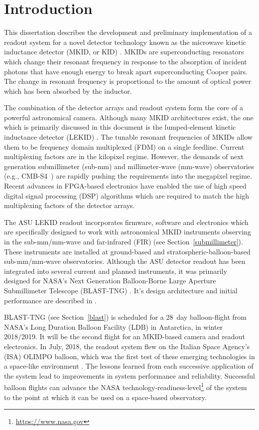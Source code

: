 \chapter{Introduction}\label{intro}

This dissertation describes the development and preliminary implementation of a readout system for a novel detector technology known as the microwave kinetic inductance detector (MKID, or KID) \citep{day2003broadband, mazin2005microwave}. MKIDs are superconducting resonators which change their resonant frequency in response to the absorption of incident photons that have enough energy to break apart superconducting Cooper pairs. The change in resonant frequency is proportional to the amount of optical power which has been absorbed by the inductor.

The combination of the detector arrays and readout system form the core of a powerful astronomical camera. Although many MKID architectures exist, the one which is primarily discussed in this document is the lumped-element kinetic inductance detector (LEKID) \citep{doyle2008lumped}. The tunable resonant frequencies of MKIDs allow them to be frequency domain multiplexed (FDM) on a single feedline. Current multiplexing factors are in the kilopixel regime. However, the demands of next generation submillimeter (sub-mm) and millimeter-wave (mm-wave) observatories (e.g., CMB-S4~\citet{abitbol2017cmb}) are rapidly pushing the requirements into the megapixel regime. Recent advances in FPGA-based electronics have enabled the use of high speed digital signal processing (DSP) algorithms which are required to match the high multiplexing factors of the detector arrays.

The ASU LEKID readout incorporates firmware, software and electronics which are specifically designed to work with astronomical MKID instruments observing in the sub-mm/mm-wave and far-infrared (FIR) (see Section~\ref{submillimeter}). These instruments are installed at ground-based and stratospheric-balloon-based sub-mm/mm-wave observatories. Although the ASU detector readout has been integrated into several current and planned instruments, it was primarily designed for NASA's Next Generation Balloon-Borne Large Aperture Submillimeter Telescope (BLAST-TNG) \citep{dober}. It's design architecture and initial performance are described in \citet{gordon2016}.

BLAST-TNG (see Section~\ref{blast}) is scheduled for a 28~day balloon-flight from NASA's Long Duration Balloon Facility (LDB) in Antarctica, in winter 2018/2019. It will be the second flight for an MKID-based camera and readout electronics. In July, 2018, the readout system flew on the Italian Space Agency's (ISA) OLIMPO balloon, which was the first test of these emerging technologies in a space-like environment \citep{masi2019kinetic}. The lessons learned from each successive application of the system lead to improvements in system performance and reliability. Successful balloon flights can advance the NASA technology-readiness-level\footnote{\url{https://www.nasa.gov}} of the system to the point at which it can be used on a space-based observatory.

